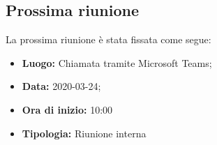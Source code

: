 	\subsection{Prossima riunione}
		La prossima riunione è stata fissata come segue: 
		\begin{itemize}
			\item \textbf{Luogo: } Chiamata tramite Microsoft Teams; 
			\item \textbf{Data: } 2020-03-24; 
			\item \textbf{Ora di inizio: } 10:00
			\item \textbf{Tipologia: } Riunione interna
		\end{itemize}